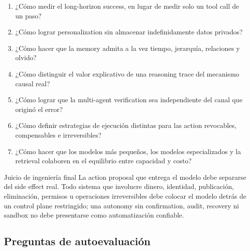 \documentclass[a4paper]{article}
\begin{document}
\begin{enumerate}
  \item ¿Cómo medir el long-horizon success, en lugar de medir solo un tool call de un paso?
  \item ¿Cómo lograr personalization sin almacenar indefinidamente datos privados?
  \item ¿Cómo hacer que la memory admita a la vez tiempo, jerarquía, relaciones y olvido?
  \item ¿Cómo distinguir el valor explicativo de una reasoning trace del mecanismo causal real?
  \item ¿Cómo lograr que la multi-agent verification sea independiente del canal que originó el error?
  \item ¿Cómo definir estrategias de ejecución distintas para las action revocables, compensables e irreversibles?
  \item ¿Cómo hacer que los modelos más pequeños, los modelos especializados y la retrieval colaboren en el equilibrio entre capacidad y costo?
\end{enumerate}

\begin{warningbox}{Juicio de ingeniería final}
La action proposal que entrega el modelo debe separarse del side effect real. Todo sistema que involucre dinero, identidad, publicación, eliminación, permisos u operaciones irreversibles debe colocar el modelo detrás de un control plane restringido; una autonomy sin confirmation, audit, recovery ni sandbox no debe presentarse como automatización confiable.
\end{warningbox}

\subsection{Preguntas de autoevaluación}
\end{document}
